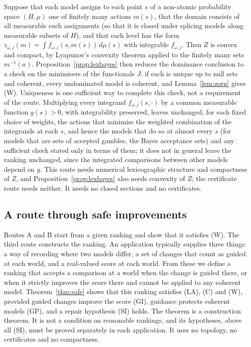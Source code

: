 \documentclass[11pt]{article}
\theoremstyle{definition}
\theoremstyle{remark}
\begin{document}
Suppose that each model assigns to each point $s$ of a non-atomic probability space $(H,\mu)$ one of finitely many actions $m(s)$, that the domain consists of all measurable such assignments (so that it is closed under splicing models along measurable subsets of $H$), and that each level has the form $z_{\omega,j}(m)=\int f_{\omega,j}(s,m(s))\,d\mu(s)$ with integrable $f_{\omega,j}$. Then $Z$ is convex and compact, by Lyapunov's convexity theorem applied to the finitely many sets $m^{-1}(a)$. Proposition~\ref{prop:lexbayes} then reduces the dominance conclusion to a check on the minimisers of the functionals $J$: if each is unique up to null sets and coherent, every undominated model is coherent, and Lemma~\ref{lem:zorn} gives (W). Uniqueness is one sufficient way to complete this check, not a requirement of the route. Multiplying every integrand $f_{\omega,j}(s,\cdot)$ by a common measurable function $g(s)>0$, with integrability preserved, leaves unchanged, for each fixed choice of weights, the actions that minimise the weighted combination of the integrands at each $s$, and hence the models that do so at almost every $s$ (for models that are sets of accepted gambles, the Bayes acceptance sets) and any sufficient check stated only in terms of them; it does not in general leave the ranking unchanged, since the integrated comparisons between other models depend on $g$. This route needs numerical lexicographic structure and compactness of $Z$, and Proposition~\ref{prop:lexbayes} also needs convexity of $Z$; the certificate route needs neither. It needs no closed sections and no certificates.

\subsection{A route through safe improvements}\label{sec:safe}
Routes A and B start from a given ranking and show that it satisfies (W). The third route constructs the ranking. An application typically supplies three things: a way of recording where two models differ, a set of changes that count as guided at each world, and a real-valued score at each world. From these we define a ranking that accepts a comparison at a world when the change is guided there, or when it strictly improves the score there and cannot be applied to any coherent model. Theorem~\ref{thm:safe} shows that this ranking satisfies (LA), (C) and (W), provided guided changes improve the score (GI), guidance protects coherent models (GP), and a repair hypothesis (SI) holds. The theorem is a construction theorem. It is not a condition on reasonable rankings, and its hypotheses, above all (SI), must be proved separately in each application. It uses no topology, no certificates and no compactness.
\end{document}
